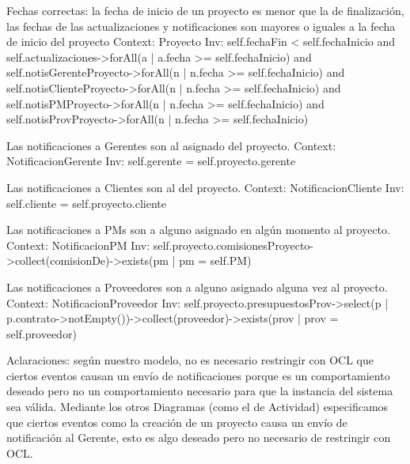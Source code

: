 \begin{listocl}

\begin{itemocl}{Fechas correctas: la fecha de inicio de un proyecto es menor que la de finalización, las fechas de las actualizaciones y notificaciones son mayores o iguales a la fecha de inicio del proyecto}
Context: Proyecto
Inv: self.fechaFin < self.fechaInicio and self.actualizaciones->forAll(a | a.fecha >= self.fechaInicio) and self.notisGerenteProyecto->forAll(n | n.fecha >= self.fechaInicio) and self.notisClienteProyecto->forAll(n | n.fecha >= self.fechaInicio) and self.notisPMProyecto->forAll(n | n.fecha >= self.fechaInicio) and self.notisProvProyecto->forAll(n | n.fecha >= self.fechaInicio)
\end{itemocl}


\begin{itemocl}{Las notificaciones a Gerentes son al asignado del proyecto.}
Context: NotificacionGerente
Inv: self.gerente = self.proyecto.gerente
\end{itemocl}

\begin{itemocl}{Las notificaciones a Clientes son al del proyecto.}
Context: NotificacionCliente
Inv: self.cliente = self.proyecto.cliente
\end{itemocl}

\begin{itemocl}{Las notificaciones a PMs son a alguno asignado en algún momento al proyecto.}
Context: NotificacionPM
Inv: self.proyecto.comisionesProyecto->collect(comisionDe)->exists(pm | pm = self.PM)
\end{itemocl}

\begin{itemocl}{Las notificaciones a Proveedores son a alguno asignado alguna vez al proyecto.}
Context: NotificacionProveedor
Inv: self.proyecto.presupuestosProv->select(p | p.contrato->notEmpty())->collect(proveedor)->exists(prov | prov = self.proveedor)
\end{itemocl}

\end{listocl}

Aclaraciones: según nuestro modelo, no es necesario restringir con OCL que ciertos eventos causan un envío de notificaciones porque es un comportamiento deseado pero no un comportamiento necesario para que la instancia del sistema sea válida. Mediante los otros Diagramas (como el de Actividad) especificamos que ciertos eventos como la creación de un proyecto causa un envío de notificación al Gerente, esto es algo deseado pero no necesario de restringir con OCL.
